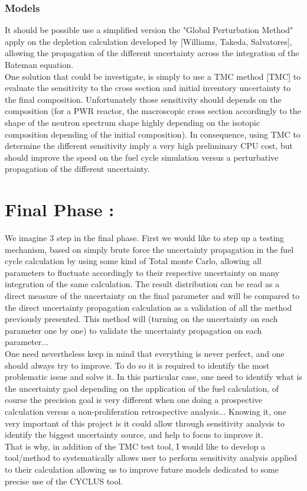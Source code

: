 \documentclass[dvips,12pt]{article}
\begin{document}
\subsubsection{Models}
It should be possible use a simplified version the "Global Perturbation Method"  apply on the depletion calculation developed by [Williams, Takeda, Salvatores], allowing the propagation of the different uncertainty across the integration of the Bateman equation.\\
One solution that could be investigate, is simply to use a TMC method [TMC] to evaluate the sensitivity to the cross section and initial inventory uncertainty to the final composition. Unfortunately those sensitivity should depends on the composition (for a PWR reactor, the macroscopic cross section accordingly to the shape of the neutron spectrum shape highly depending on the isotopic composition depending of the initial composition). In consequence, using TMC to determine the different sensitivity imply a very high preliminary CPU cost, but should improve the speed on the fuel cycle simulation versus a perturbative propagation of the different uncertainty.\\



\section{Final Phase :}
We imagine 3 step in the final phase. First we would like to step up a testing mechanism, based on simply brute force the uncertainty propagation in the fuel cycle calculation by using some kind of Total monte Carlo, allowing all parameters to fluctuate accordingly to their respective uncertainty on many integration of the same calculation. The result distribution can be read as a direct measure of the uncertainty on the final parameter and will be compared to the direct uncertainty propagation calculation as a validation of all the method previously presented. This method will (turning on the uncertainty on each parameter one by one) to validate the uncertainty propagation on each parameter...\\
One need nevertheless keep in mind that everything is never perfect, and one should always try to improve. To do so it is required to identify the most problematic issue and solve it. In this particular case, one need to identify what is the uncertainty gaol depending on the application of the fuel calculation, of course the precision goal is very different when one doing a prospective calculation versus a non-proliferation retrospective analysis... Knowing it, one very important of this project is it could allow through sensitivity analysis to identify the biggest uncertainty source, and help to focus to improve it.\\
That is why, in addition of the TMC test tool, I would like to develop a tool/method to systematically allows user to perform sensitivity analysis applied to their calculation allowing us to improve future models dedicated to some precise use of the CYCLUS tool.\\
\end{document}
